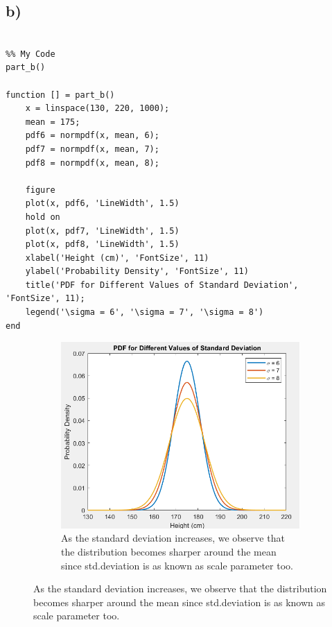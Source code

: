 \documentclass[12pt]{article}
\begin{document}
\subsection*{b)} 
\begin{lstlisting}[style=Matlab-editor]

%% My Code
part_b()

function [] = part_b()
    x = linspace(130, 220, 1000);
    mean = 175;
    pdf6 = normpdf(x, mean, 6);
    pdf7 = normpdf(x, mean, 7);
    pdf8 = normpdf(x, mean, 8);
    
    figure
    plot(x, pdf6, 'LineWidth', 1.5)
    hold on
    plot(x, pdf7, 'LineWidth', 1.5)
    plot(x, pdf8, 'LineWidth', 1.5)
    xlabel('Height (cm)', 'FontSize', 11)
    ylabel('Probability Density', 'FontSize', 11)
    title('PDF for Different Values of Standard Deviation', 'FontSize', 11);
    legend('\sigma = 6', '\sigma = 7', '\sigma = 8')
end

\end{lstlisting}

\begin{figure}[H]
  \centering
  \begin{subfigure}[b]{0.4\linewidth}
    \includegraphics[width=\linewidth]{Screenshot (1459).png}
    \caption{As the standard deviation increases, we observe that the distribution becomes sharper around the mean since std.deviation is as known as scale parameter too.}
  \end{subfigure}
\end{figure}
\end{document}
